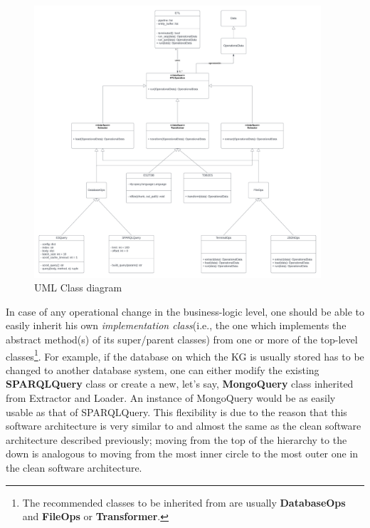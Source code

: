 \begin{figure}[H]
	\centering
	\includegraphics[width=0.95\textwidth]{../../resources/soft_arch.png}
	\caption{UML Class diagram}
	\label{fig:soft_arch}
\end{figure}

In case of any operational change in the business-logic level, one should be able to easily inherit his 
own \textit{implementation class}(i.e., the one which implements the abstract method(s) of its 
super/parent classes) from one or more of the top-level classes\footnote{The recommended classes to be 
inherited from are usually \textbf{DatabaseOps} and \textbf{FileOps} or \textbf{Transformer}.}. For 
example, if the database on which the KG is usually stored has to be changed to another database system, 
one can either modify the existing \textbf{SPARQLQuery} class or create a new, let's say, 
\textbf{MongoQuery} class inherited from Extractor and Loader. An instance of MongoQuery would be 
as easily 
usable as that of SPARQLQuery. This flexibility is due to the reason that this software architecture is 
very similar to and almost the same as the clean software architecture described previously; moving 
from the top of the hierarchy to the down is analogous to moving from the most inner circle to the 
most outer one in the clean software architecture.

